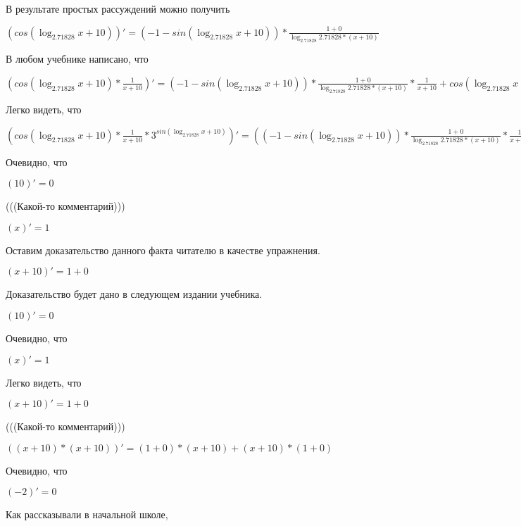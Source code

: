 \documentclass[12pt,a4paper,fleqn]{article}
\theoremstyle{definition}
\begin{document}
В результате простых рассуждений можно получить

$(cos(\log_{ 2.71828 }{ x  +  10 }))' = ( -1  - sin(\log_{ 2.71828 }{ x  +  10 })) * \frac{ 1  +  0 }{\log_{ 2.71828 }{ 2.71828 } * ( x  +  10 )}
$

В любом учебнике написано, что

$(cos(\log_{ 2.71828 }{ x  +  10 }) * \frac{ 1 }{ x  +  10 }
)' = ( -1  - sin(\log_{ 2.71828 }{ x  +  10 })) * \frac{ 1  +  0 }{\log_{ 2.71828 }{ 2.71828 } * ( x  +  10 )}
 * \frac{ 1 }{ x  +  10 }
 + cos(\log_{ 2.71828 }{ x  +  10 }) * \frac{ 0  * ( x  +  10 ) -  1  * ( 1  +  0 )}{( x  +  10 ) * ( x  +  10 )}
$

Легко видеть, что

$(cos(\log_{ 2.71828 }{ x  +  10 }) * \frac{ 1 }{ x  +  10 }
 * { 3 }^{sin(\log_{ 2.71828 }{ x  +  10 })})' = (( -1  - sin(\log_{ 2.71828 }{ x  +  10 })) * \frac{ 1  +  0 }{\log_{ 2.71828 }{ 2.71828 } * ( x  +  10 )}
 * \frac{ 1 }{ x  +  10 }
 + cos(\log_{ 2.71828 }{ x  +  10 }) * \frac{ 0  * ( x  +  10 ) -  1  * ( 1  +  0 )}{( x  +  10 ) * ( x  +  10 )}
) * { 3 }^{sin(\log_{ 2.71828 }{ x  +  10 })} + cos(\log_{ 2.71828 }{ x  +  10 }) * \frac{ 1 }{ x  +  10 }
 * \log_{ 2.71828 }{ 3 } * cos(\log_{ 2.71828 }{ x  +  10 }) * \frac{ 1  +  0 }{\log_{ 2.71828 }{ 2.71828 } * ( x  +  10 )}
 * { 3 }^{sin(\log_{ 2.71828 }{ x  +  10 })}$

Очевидно, что

$( 10 )' =  0 $

(((Какой-то комментарий)))

$( x )' =  1 $

Оставим доказательство данного факта читателю в качестве упражнения.

$( x  +  10 )' =  1  +  0 $

Доказательство будет дано в следующем издании учебника.

$( 10 )' =  0 $

Очевидно, что

$( x )' =  1 $

Легко видеть, что

$( x  +  10 )' =  1  +  0 $

(((Какой-то комментарий)))

$(( x  +  10 ) * ( x  +  10 ))' = ( 1  +  0 ) * ( x  +  10 ) + ( x  +  10 ) * ( 1  +  0 )$

Очевидно, что

$( -2 )' =  0 $

Как рассказывали в начальной школе,
\end{document}
